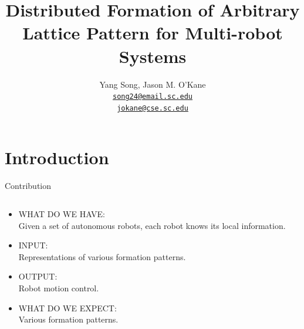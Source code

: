 \documentclass[10pt]{beamer}
\title{Distributed Formation of Arbitrary Lattice Pattern for
  Multi-robot Systems}
\author{
  Yang Song, Jason M. O'Kane\\
  \href{mailto:song24@email.sc.edu}{{\tt song24@email.sc.edu} \\
  \href{mailto:jokane@cse.sc.edu}{\tt jokane@cse.sc.edu}}
}
\institute[
  Dept.\ of Computer Science and Engineering\\
  University of South Carolina
] %
{%
  Dept. of Computer Science and Engineering\\
  University of South Carolina
  
}
\begin{document}
\begin{frame}[plain] %
  \titlepage
\end{frame}

\section{Introduction}
\begin{frame}{Contribution}{}
\begin{block}{}
  \begin{columns}[T] %
    \begin{column}{.48\textwidth}
      \begin{itemize}
      \item {\textcolor{scred}{\large WHAT DO WE HAVE:}}\\
        Given a set of autonomous robots, each robot knows its local information.
      \item {\textcolor{scred}{\large INPUT:}}\\
        Representations of various formation patterns.
      \item {\textcolor{scred}{\large OUTPUT:}}\\
        Robot motion control.
      \item {\textcolor{scred}{\large WHAT DO WE EXPECT:}}\\
        Various formation patterns.
      \end{itemize}
    \end{column}%
    \begin{column}{.48\textwidth}
    \end{column}%
  \end{columns}
  
\end{block}
\end{frame}

\end{document}
